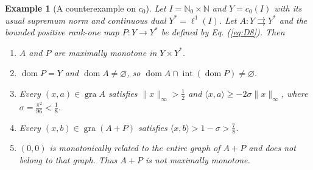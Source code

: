 \documentclass[11pt]{article}
\newcommand{\N}{\mathbb N}
\newcommand{\Nzero}{\mathbb N_0}
\newcommand{\gra}{\operatorname{gra}}
\newcommand{\dom}{\operatorname{dom}}
\newcommand{\pair}[2]{\langle #1,#2\rangle}
\newtheorem{example}{Example}
\theoremstyle{definition}
\theoremstyle{remark}
\begin{document}
\begin{example}[A counterexample on $c_0$]\label{thm:C}
Let $I=\Nzero\times\N$ and $Y=c_0(I)$ with its usual supremum norm and continuous dual $Y^*=\ell^1(I)$. Let $A:Y\rightrightarrows Y^*$ and the bounded positive rank-one map $P:Y\to Y^*$ be defined by Eq. (\ref{eq:D8}). Then 
\begin{enumerate}
\item\label{thm:C-maximality} $A$ and $P$ are maximally monotone in $Y\times Y^*$.
\item\label{thm:C-domain} $\dom P=Y$ and $\dom A\ne\varnothing$, so
$\dom A\cap\operatorname{int}(\dom P)\ne\varnothing$.
\item\label{thm:C-bound} Every $(x,a)\in\gra A$ satisfies $\|x\|_\infty>\frac{1}{2}$ and
$\pair{x}{a}\ge-2\sigma\|x\|_\infty$, where $\sigma=\frac{\pi^2}{96}<\frac{1}{8}$.
\item\label{thm:C-pairing} Every $(x,b)\in\gra(A+P)$ satisfies
$\pair{x}{b}>1-\sigma>\frac{7}{8}$.
\item\label{thm:C-sum} $(0,0)$ is monotonically related to the entire graph of $A+P$ and
does not belong to that graph. Thus $A+P$ is not maximally monotone.
\end{enumerate}
\end{example}
\end{document}
